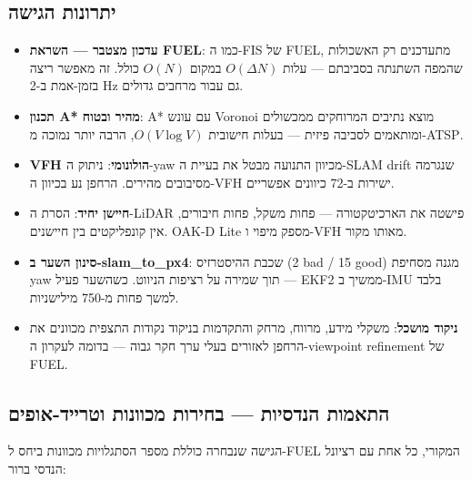 \documentclass[11pt,a4paper]{article}
\begin{document}
\subsection{יתרונות הגישה}

\begin{itemize}
    \item \textbf{עדכון מצטבר — השראת \textenglish{FUEL}}: כמו ה-\textenglish{FIS} של \textenglish{FUEL}, מתעדכנים רק האשכולות שהמפה השתנתה בסביבתם — עלות $O(\Delta N)$ במקום $O(N)$ כולל. זה מאפשר ריצה בזמן-אמת ב-2 \textenglish{Hz} גם עבור מרחבים גדולים.

    \item \textbf{תכנון \textenglish{A*} מהיר ובטוח}: \textenglish{A*} עם עונש \textenglish{Voronoi} מוצא נתיבים המרוחקים ממכשולים ומותאמים לסביבה פיזית — בעלות חישובית $O(V \log V)$, הרבה יותר נמוכה מ-\textenglish{ATSP}.

    \item \textbf{\textenglish{VFH} הולונומי}: ניתוק ה-\textenglish{yaw} מכיוון התנועה מבטל את בעיית ה-\textenglish{SLAM drift} שנגרמה מסיבובים מהירים. הרחפן נע בכיוון ה-\textenglish{VFH} ישירות ב-72 כיוונים אפשריים.

    \item \textbf{חיישן יחיד}: הסרת ה-\textenglish{LiDAR} פישטה את הארכיטקטורה — פחות משקל, פחות חיבורים, אין קונפליקטים בין חיישנים. \textenglish{OAK-D Lite} מספק מיפוי ו-\textenglish{VFH} מאותו מקור.

    \item \textbf{סינון השער ב-\textenglish{slam\_to\_px4}}: שכבת ההיסטרזיס (2 bad / 15 good) מגנה מסחיפת \textenglish{yaw} תוך שמירה על רציפות הניווט. כשהשער פעיל — \textenglish{EKF2} ממשיך ב-\textenglish{IMU} בלבד למשך פחות מ-750 מילישניות.

    \item \textbf{ניקוד מושכל}: משקלי מידע, מרווח, מרחק והתקדמות בניקוד נקודות התצפית מכוונים את הרחפן לאזורים בעלי ערך חקר גבוה — בדומה לעקרון ה-\textenglish{viewpoint refinement} של \textenglish{FUEL}.
\end{itemize}

\subsection{התאמות הנדסיות — בחירות מכוונות וטרייד-אופים}

הגישה שנבחרה כוללת מספר הסתגלויות מכוונות ביחס ל-\textenglish{FUEL} המקורי, כל אחת עם רציונל הנדסי ברור:
\end{document}
